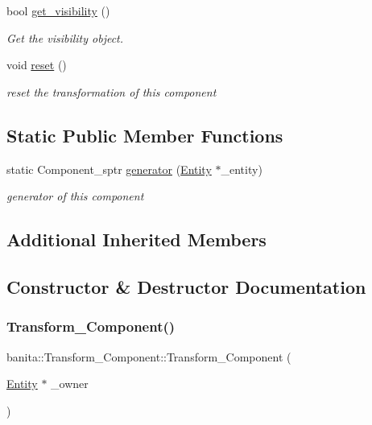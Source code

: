 \begin{DoxyCompactItemize}
bool \mbox{\hyperlink{classbanita_1_1_transform___component_acd8c38c25e9ca8aa7f527605907bca7b}{get\+\_\+visibility}} ()
\begin{DoxyCompactList}\small\item\em Get the visibility object. \end{DoxyCompactList}\item 
void \mbox{\hyperlink{classbanita_1_1_transform___component_a53215c14bf428c45f39df2861bfeda6a}{reset}} ()
\begin{DoxyCompactList}\small\item\em reset the transformation of this component \end{DoxyCompactList}\end{DoxyCompactItemize}
\subsection*{Static Public Member Functions}
\begin{DoxyCompactItemize}
\item 
static Component\+\_\+sptr \mbox{\hyperlink{classbanita_1_1_transform___component_a52942de64acefae0655fb17a71add8f3}{generator}} (\mbox{\hyperlink{classbanita_1_1_entity}{Entity}} $\ast$\+\_\+entity)
\begin{DoxyCompactList}\small\item\em generator of this component \end{DoxyCompactList}\end{DoxyCompactItemize}
\subsection*{Additional Inherited Members}


\subsection{Constructor \& Destructor Documentation}
\mbox{\label{classbanita_1_1_transform___component_af0df15865b1b3576bae0fa9cbdce2669}} 
\subsubsection{\texorpdfstring{Transform\_Component()}{Transform\_Component()}}
{\footnotesize\ttfamily banita\+::\+Transform\+\_\+\+Component\+::\+Transform\+\_\+\+Component (\begin{DoxyParamCaption}\item[{\mbox{\hyperlink{classbanita_1_1_entity}{Entity}} $\ast$}]{\+\_\+owner }\end{DoxyParamCaption})}



